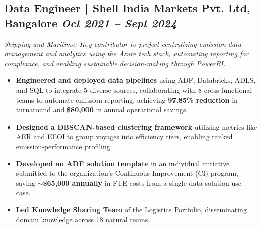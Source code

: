 \documentclass[10pt,a4paper]{article}
\begin{document}
\subsection{Data Engineer | Shell India Markets Pvt. Ltd, Bangalore \hfill
\textit{Oct 2021 -- Sept 2024}}
\textit{Shipping and Maritime: Key contributor to project centralizing emission data management and analytics using the Azure tech stack, automating reporting for compliance, and enabling sustainable decision-making through PowerBI.}
\begin{itemize}
    \item \textbf{Engineered and deployed data pipelines} using ADF, Databricks, ADLS, and SQL to integrate 5 diverse sources, collaborating with 8 cross-functional teams to automate emission reporting, achieving \textbf{97.85\% reduction} in turnaround and \textbf{\$80,000} in annual operational savings.
    \item \textbf{Designed a DBSCAN-based clustering framework} utilizing metrics like AER and EEOI to group voyages into efficiency tiers, enabling ranked emission-performance profiling.
    \item \textbf{Developed an ADF solution template} in an individual initiative submitted to the organization's Continuous Improvement (CI) program, saving \textbf{$\sim$\$65,000 annually} in FTE costs from a single data solution use case.
    \item \textbf{Led Knowledge Sharing Team} of the Logistics Portfolio, disseminating domain knowledge across 18 natural teams.
\end{itemize}
\vspace{0.3em}
\end{document}
